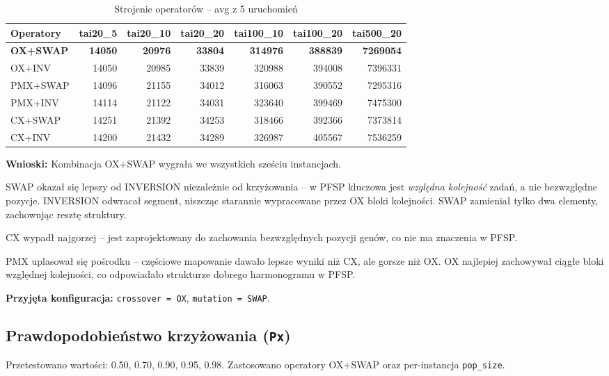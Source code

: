 \documentclass[11pt,a4paper]{article}
\begin{document}
\begin{table}[H]
\centering
\caption{Strojenie operatorów -- avg z 5 uruchomień}
\begin{tabular}{lrrrrrr}
\toprule
Operatory & tai20\_5 & tai20\_10 & tai20\_20 & tai100\_10 & tai100\_20 & tai500\_20 \\
\midrule
\textbf{OX+SWAP}  & \textbf{14050} & \textbf{20976} & \textbf{33804} & \textbf{314976} & \textbf{388839} & \textbf{7269054} \\
OX+INV   & 14050 & 20985 & 33839 & 320988 & 394008 & 7396331 \\
PMX+SWAP & 14096 & 21155 & 34012 & 316063 & 390552 & 7295316 \\
PMX+INV  & 14114 & 21122 & 34031 & 323640 & 399469 & 7475300 \\
CX+SWAP  & 14251 & 21392 & 34253 & 318466 & 392366 & 7373814 \\
CX+INV   & 14200 & 21432 & 34289 & 326987 & 405567 & 7536259 \\
\bottomrule
\end{tabular}
\end{table}

\textbf{Wnioski:} Kombinacja OX+SWAP wygrała we wszystkich sześciu instancjach.

SWAP okazał się lepszy od INVERSION niezależnie od krzyżowania -- w PFSP kluczowa jest \emph{względna kolejność} zadań, a nie bezwzględne pozycje. INVERSION odwracał segment, niszcząc starannie wypracowane przez OX bloki kolejności. SWAP zamieniał tylko dwa elementy, zachowując resztę struktury.

CX wypadł najgorzej -- jest zaprojektowany do zachowania bezwzględnych pozycji genów, co nie ma znaczenia w PFSP.

PMX uplasował się pośrodku -- częściowe mapowanie dawało lepsze wyniki niż CX, ale gorsze niż OX. OX najlepiej zachowywał ciągłe bloki względnej kolejności, co odpowiadało strukturze dobrego harmonogramu w PFSP.

\textbf{Przyjęta konfiguracja:} \texttt{crossover = OX}, \texttt{mutation = SWAP}.

\subsection{Prawdopodobieństwo krzyżowania (\texttt{Px})}

Przetestowano wartości: 0.50, 0.70, 0.90, 0.95, 0.98. Zastosowano operatory OX+SWAP oraz per-instancja \texttt{pop\_size}.
\end{document}
